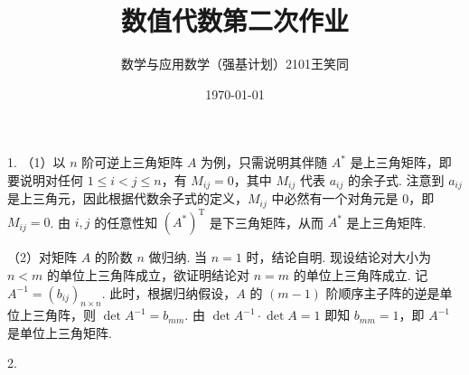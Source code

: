 \documentclass[UTF8]{ctexart}
\title{\vspace{-2cm}数值代数第二次作业}
\author{数学与应用数学（强基计划）2101\quad 王笑同\quad 3210105450}
\date{\today}
\begin{document}
\maketitle

\pagestyle{plain}

1. （1）以 $n$ 阶可逆上三角矩阵 $A$ 为例，只需说明其伴随 $A^*$ 是上三角矩阵，即要说明对任何 $1\leqslant i<j\leqslant n$，有 $M_{ij}=0$，其中 $M_{ij}$ 代表 $a_{ij}$ 的余子式. 注意到 $a_{ij}$ 是上三角元，因此根据代数余子式的定义，$M_{ij}$ 中必然有一个对角元是 $0$，即 $M_{ij}=0$. 由 $i,j$ 的任意性知 $(A^{*})^{\mathrm{T}}$ 是下三角矩阵，从而 $A^*$ 是上三角矩阵.

（2）对矩阵 $A$ 的阶数 $n$ 做归纳. 当 $n=1$ 时，结论自明. 现设结论对大小为 $n<m$ 的单位上三角阵成立，欲证明结论对 $n=m$ 的单位上三角阵成立. 记 $A^{-1}=(b_{ij})_{n\times n}$. 此时，根据归纳假设，$A$ 的 $(m-1)$ 阶顺序主子阵的逆是单位上三角阵，则 $\det A^{-1}=b_{mm}$. 由 $\det A^{-1}\cdot \det A=1$ 即知 $b_{mm}=1$，即 $A^{-1}$ 是单位上三角矩阵.

2. 
\end{document}
